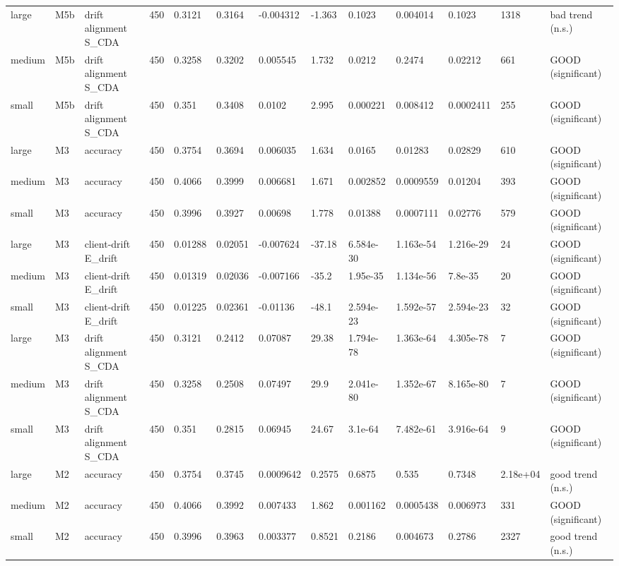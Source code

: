 \begin{table}[t]
\begin{tabular}{lllllllllllll}
large & M5b & drift alignment S\_CDA & 450 & 0.3121 & 0.3164 & -0.004312 & -1.363 & 0.1023 & 0.004014 & 0.1023 & 1318 & bad trend (n.s.) \\
medium & M5b & drift alignment S\_CDA & 450 & 0.3258 & 0.3202 & 0.005545 & 1.732 & 0.0212 & 0.2474 & 0.02212 & 661 & GOOD (significant) \\
small & M5b & drift alignment S\_CDA & 450 & 0.351 & 0.3408 & 0.0102 & 2.995 & 0.000221 & 0.008412 & 0.0002411 & 255 & GOOD (significant) \\
large & M3 & accuracy & 450 & 0.3754 & 0.3694 & 0.006035 & 1.634 & 0.0165 & 0.01283 & 0.02829 & 610 & GOOD (significant) \\
medium & M3 & accuracy & 450 & 0.4066 & 0.3999 & 0.006681 & 1.671 & 0.002852 & 0.0009559 & 0.01204 & 393 & GOOD (significant) \\
small & M3 & accuracy & 450 & 0.3996 & 0.3927 & 0.00698 & 1.778 & 0.01388 & 0.0007111 & 0.02776 & 579 & GOOD (significant) \\
large & M3 & client-drift E\_drift & 450 & 0.01288 & 0.02051 & -0.007624 & -37.18 & 6.584e-30 & 1.163e-54 & 1.216e-29 & 24 & GOOD (significant) \\
medium & M3 & client-drift E\_drift & 450 & 0.01319 & 0.02036 & -0.007166 & -35.2 & 1.95e-35 & 1.134e-56 & 7.8e-35 & 20 & GOOD (significant) \\
small & M3 & client-drift E\_drift & 450 & 0.01225 & 0.02361 & -0.01136 & -48.1 & 2.594e-23 & 1.592e-57 & 2.594e-23 & 32 & GOOD (significant) \\
large & M3 & drift alignment S\_CDA & 450 & 0.3121 & 0.2412 & 0.07087 & 29.38 & 1.794e-78 & 1.363e-64 & 4.305e-78 & 7 & GOOD (significant) \\
medium & M3 & drift alignment S\_CDA & 450 & 0.3258 & 0.2508 & 0.07497 & 29.9 & 2.041e-80 & 1.352e-67 & 8.165e-80 & 7 & GOOD (significant) \\
small & M3 & drift alignment S\_CDA & 450 & 0.351 & 0.2815 & 0.06945 & 24.67 & 3.1e-64 & 7.482e-61 & 3.916e-64 & 9 & GOOD (significant) \\
large & M2 & accuracy & 450 & 0.3754 & 0.3745 & 0.0009642 & 0.2575 & 0.6875 & 0.535 & 0.7348 & 2.18e+04 & good trend (n.s.) \\
medium & M2 & accuracy & 450 & 0.4066 & 0.3992 & 0.007433 & 1.862 & 0.001162 & 0.0005438 & 0.006973 & 331 & GOOD (significant) \\
small & M2 & accuracy & 450 & 0.3996 & 0.3963 & 0.003377 & 0.8521 & 0.2186 & 0.004673 & 0.2786 & 2327 & good trend (n.s.) \\

\end{tabular}
\end{table}
